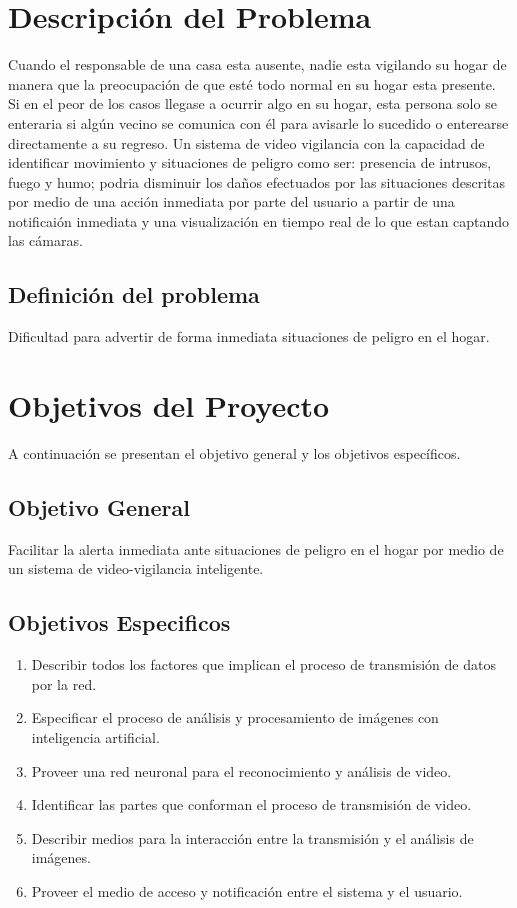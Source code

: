 \section{Descripción del Problema}
Cuando el responsable de una casa esta ausente, nadie esta vigilando su hogar de manera que la preocupación de que esté todo normal en su hogar esta presente. Si en el peor de los casos llegase a ocurrir algo en su hogar, esta persona solo se enteraria si algún vecino se comunica con él para avisarle lo sucedido o enterearse directamente a su regreso. Un sistema de video vigilancia con la capacidad de identificar movimiento y situaciones de peligro como ser: presencia de intrusos, fuego y humo; podria disminuir los daños efectuados por las situaciones descritas por medio de una acción inmediata por parte del usuario a partir de una notificaión inmediata y una visualización en tiempo real de lo que estan captando las cámaras.\\

\subsection{Definición del problema}
Dificultad para advertir de forma inmediata situaciones de peligro en el hogar.

\section{Objetivos del Proyecto}
A continuación se presentan el objetivo general y los objetivos específicos.

\subsection{Objetivo General}
Facilitar la alerta inmediata ante situaciones de peligro en el hogar por medio de un sistema de video-vigilancia inteligente.

\subsection{Objetivos Especificos}
\begin{enumerate}
    \item Describir todos los factores que implican el proceso de transmisión de datos por la red.
    \item Especificar el proceso de análisis y procesamiento de imágenes con inteligencia artificial.
    \item Proveer una red neuronal para el reconocimiento y análisis de video.
    \item Identificar las partes que conforman el proceso de transmisión de video.
    \item Describir medios para la interacción entre la transmisión y el análisis de imágenes.
    \item Proveer el medio de acceso y notificación entre el sistema y el usuario.
\end{enumerate}

